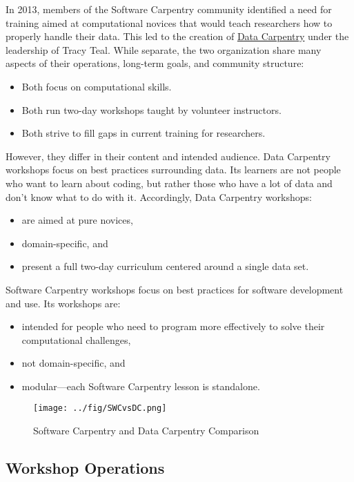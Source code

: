 In 2013, members of the Software Carpentry community identified a need
for training aimed at computational novices that would teach researchers
how to properly handle their data. This led to the creation of
\href{http://datacarpentry.org}{Data Carpentry} under the leadership
of Tracy Teal. While separate, the two organization share many aspects
of their operations, long-term goals, and community structure:

\begin{itemize}
\item
  Both focus on computational skills.
\item
  Both run two-day workshops taught by volunteer instructors.
\item
  Both strive to fill gaps in current training for researchers.
\end{itemize}

However, they differ in their content and intended audience. Data
Carpentry workshops focus on best practices surrounding data. Its
learners are not people who want to learn about coding, but rather those
who have a lot of data and don't know what to do with it. Accordingly,
Data Carpentry workshops:

\begin{itemize}
\item
  are aimed at pure novices,
\item
  domain-specific, and
\item
  present a full two-day curriculum centered around a single data set.
\end{itemize}

Software Carpentry workshops focus on best practices for software
development and use. Its workshops are:

\begin{itemize}
\item
  intended for people who need to program more effectively to solve
  their computational challenges,
\item
  not domain-specific, and
\item
  modular---each Software Carpentry lesson is standalone.
\end{itemize}

\begin{figure}[htbp]
\centering
\texttt{[image: ../fig/SWCvsDC.png]}
\caption{Software Carpentry and Data Carpentry Comparison}
\end{figure}

\subsection{Workshop Operations}\label{workshop-operations}

